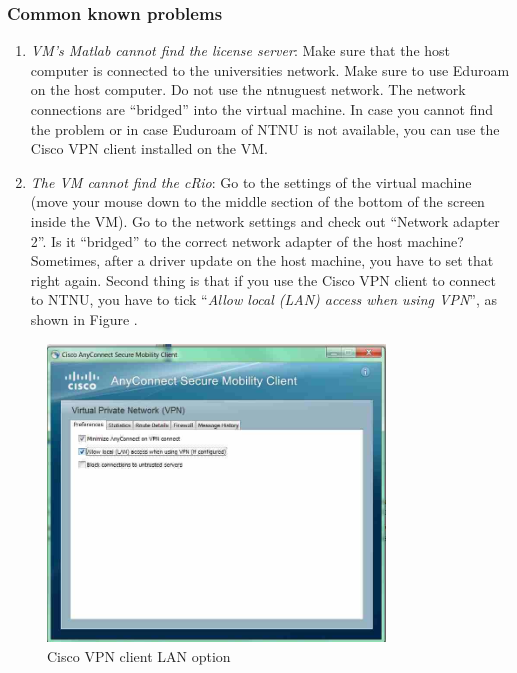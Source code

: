\documentclass[a4paper,twoside,english]{report}
\begin{document}
\subsubsection{Common known problems}
\begin{enumerate}
\item \emph{VM's Matlab cannot find the license server}: Make sure that
the host computer is connected to the universities network. Make sure
to use Eduroam on the host computer. Do not use the ntnuguest network.
The network connections are ``bridged'' into the virtual machine.
In case you cannot find the problem or in case Euduroam of NTNU is
not available, you can use the Cisco VPN client installed on the VM. 
\item \emph{The VM cannot find the cRio}: Go to the settings of the virtual
machine (move your mouse down to the middle section of the bottom
of the screen inside the VM). Go to the network settings and check
out ``Network adapter 2''. Is it ``bridged'' to the correct network
adapter of the host machine? Sometimes, after a driver update on the
host machine, you have to set that right again. Second thing is that
if you use the Cisco VPN client to connect to NTNU, you have to tick
``\emph{Allow local (LAN) access when using VPN}'', as shown in
Figure \label{fig: VPNtick}.
\end{enumerate}
\begin{figure}
\includegraphics[width=0.8\textwidth]{fig/VMVPNProb}

\caption{Cisco VPN client LAN option}

\end{figure}

\clearpage{}
\end{document}
